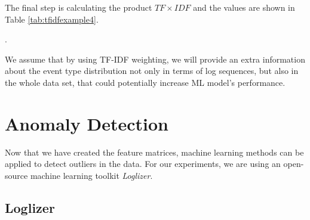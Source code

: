 The final step is calculating the product $TF \times IDF$ and the values are shown in Table \ref{tab:tfidfexample4}.

\begin{table}[!h]
    \centering
    \caption{TF and IDF scores from the example are multiplied to obtain TF-IDF}.
    \label{tab:tfidfexample4}
\end{table}

We assume that by using TF-IDF weighting, we will provide an extra information about the event type distribution not only in terms of log sequences, but also in the whole data set, that could potentially increase ML model's performance. 

\section{Anomaly Detection}

Now that we have created the feature matrices, machine learning methods can be applied to detect outliers in the data. For our experiments, we are using an open-source machine learning toolkit \textit{Loglizer}. 

\subsection{Loglizer}
\label{subscetion:loglizer}

